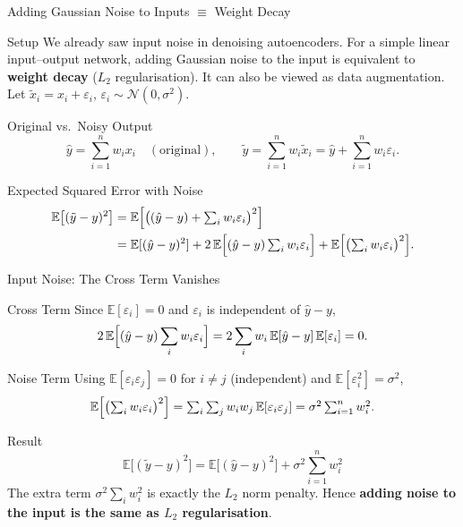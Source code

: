 \documentclass{beamer}
\begin{document}
\begin{frame}[shrink=10]{Adding Gaussian Noise to Inputs $\equiv$ Weight Decay}
  \begin{block}{Setup}
    We already saw input noise in denoising autoencoders. For a simple
    linear input--output network, adding Gaussian noise to the input is
    equivalent to \textbf{weight decay} ($L_2$ regularisation). It can also
    be viewed as data augmentation.
    Let $\tilde{x}_i = x_i + \varepsilon_i$, $\varepsilon_i \sim \mathcal N(0,\sigma^2)$.
  \end{block}

  \begin{block}{Original vs.\ Noisy Output}
    \[
      \hat y = \sum_{i=1}^{n} w_i x_i \quad(\text{original}),
      \qquad
      \tilde y = \sum_{i=1}^{n} w_i \tilde{x}_i
              = \hat y + \sum_{i=1}^{n} w_i \varepsilon_i .
    \]
  \end{block}

  \begin{block}{Expected Squared Error with Noise}
    \begin{align*}
      \mathbb{E}\bigl[(\tilde y - y)^2\bigr]
        &= \mathbb{E}\Bigl[\bigl((\hat y - y) + \textstyle\sum_i w_i\varepsilon_i\bigr)^2\Bigr]\\
        &= \mathbb{E}[(\hat y - y)^2]
           + 2\,\mathbb{E}\Bigl[(\hat y - y)\textstyle\sum_i w_i\varepsilon_i\Bigr]
           + \mathbb{E}\Bigl[\bigl(\textstyle\sum_i w_i\varepsilon_i\bigr)^2\Bigr].
    \end{align*}
  \end{block}
\end{frame}

\begin{frame}[shrink=10]{Input Noise: The Cross Term Vanishes}
  \begin{block}{Cross Term}
    Since $\mathbb{E}[\varepsilon_i]=0$ and $\varepsilon_i$ is independent
    of $\hat y - y$,
    \[
      2\,\mathbb{E}\Bigl[(\hat y - y)\sum_i w_i\varepsilon_i\Bigr]
        = 2\sum_i w_i\,\mathbb{E}[\hat y - y]\,\mathbb{E}[\varepsilon_i] = 0.
    \]
  \end{block}

  \begin{block}{Noise Term}
    Using $\mathbb{E}[\varepsilon_i\varepsilon_j]=0$ for $i\neq j$
    (independent) and $\mathbb{E}[\varepsilon_i^2]=\sigma^2$,
    \[
      \mathbb{E}\Bigl[\bigl(\textstyle\sum_i w_i\varepsilon_i\bigr)^2\Bigr]
        = \sum_{i}\sum_{j} w_i w_j\,\mathbb{E}[\varepsilon_i\varepsilon_j]
        = \sigma^2\sum_{i=1}^{n} w_i^2 .
    \]
  \end{block}

  \begin{alertblock}{Result}
    \[
      \boxed{\;
        \mathbb{E}\bigl[(\tilde y - y)^2\bigr]
          = \mathbb{E}\bigl[(\hat y - y)^2\bigr]
            + \sigma^2\sum_{i=1}^{n} w_i^2
      \;}
    \]
    The extra term $\sigma^2\sum_i w_i^2$ is exactly the $L_2$ norm penalty.
    Hence \textbf{adding noise to the input is the same as $L_2$
    regularisation}.
  \end{alertblock}
\end{frame}
\end{document}
